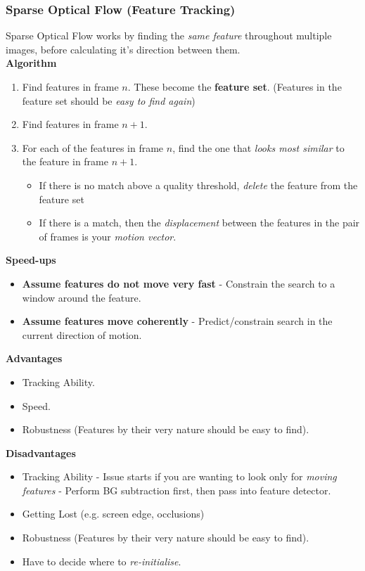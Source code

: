 \documentclass[english, 10pt]{article}
\begin{document}
\subsubsection{Sparse Optical Flow (Feature Tracking)}

Sparse Optical Flow works by finding the \textit{same feature} throughout multiple images, before calculating it's direction between them. \\

\textbf{Algorithm}

\begin{enumerate}
\item Find features in frame $n$. These become the \textbf{feature set}. (Features in the feature set should be \textit{easy to find again})
\item Find features in frame $n+1$.
\item For each of the features in frame $n$, find the one that \textit{looks most similar} to the feature in frame $n+1$. 
\begin{itemize}
\item If there is no match above a quality threshold, \textit{delete} the feature from the feature set
\item If there is a match, then the \textit{displacement} between the features in the pair of frames is your \textit{motion vector}.
\end{itemize}
\end{enumerate}

\textbf{Speed-ups}

\begin{itemize}
\item \textbf{Assume features do not move very fast} - Constrain the search to a window around the feature.
\item \textbf{Assume features move coherently} - Predict/constrain search in the current direction of motion.
\end{itemize}

\textbf{Advantages}

\begin{itemize}
\item Tracking Ability.
\item Speed.
\item Robustness (Features by their very nature should be easy to find).
\end{itemize}

\textbf{Disadvantages}

\begin{itemize}
\item Tracking Ability - Issue starts if you are wanting to look only for \textit{moving features} - Perform BG subtraction first, then pass into feature detector.
\item Getting Lost (e.g. screen edge, occlusions)
\item Robustness (Features by their very nature should be easy to find).
\item Have to decide where to \textit{re-initialise}. 
\end{itemize}
\end{document}

